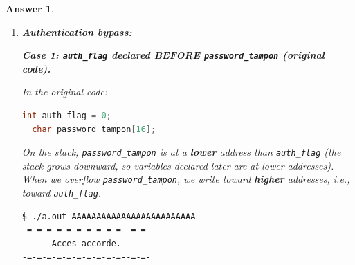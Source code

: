 \documentclass[a4paper,11pt]{article}
\theoremstyle{plain}
\newtheorem{correction}{Answer}
\theoremstyle{definition}
\begin{document}
\begin{correction}
\begin{enumerate}
The variable \texttt{valeur} now contains \texttt{0x43434343} (the ASCII code for 'C' is \texttt{0x43}). The overflow has \textbf{overwritten the integer variable} with our chosen bytes.

\medskip
\textbf{GDB analysis:}
\begin{lstlisting}[language=bash,numbers=none]
$ gdb ./a.out
(gdb) break main
(gdb) run AAAAAAAABBBBBBBBCCCC
(gdb) info locals
valeur = 5
(gdb) x/40bx tampon_deux
\end{lstlisting}

In GDB, \texttt{x/40bx} displays 40 bytes starting from \texttt{tampon\_deux}. You can observe the adjacent memory layout: \texttt{tampon\_deux} (8 bytes) $\rightarrow$ \texttt{tampon\_un} (8 bytes) $\rightarrow$ padding $\rightarrow$ \texttt{valeur} (4 bytes).

\medskip
\textbf{Explanation:} The variables are stored adjacently on the stack in decreasing address order. Since \texttt{strcpy} does not check bounds, writing beyond \texttt{tampon\_deux}'s 8 bytes continues into the memory occupied by \texttt{tampon\_un} and then \texttt{valeur}.

\begin{attention}
The exact memory layout depends on the compiler and optimization level. Always use \texttt{gdb} to verify the actual addresses and offsets on your system. The compiler may add padding between variables for alignment purposes.
\end{attention}

\item \textbf{Authentication bypass:}

\medskip
\textbf{Case 1: \texttt{auth\_flag} declared BEFORE \texttt{password\_tampon} (original code).}

In the original code:
\begin{lstlisting}[language=C,numbers=none]
  int auth_flag = 0;
  char password_tampon[16];
\end{lstlisting}

On the stack, \texttt{password\_tampon} is at a \textbf{lower} address than \texttt{auth\_flag} (the stack grows downward, so variables declared later are at lower addresses). When we overflow \texttt{password\_tampon}, we write toward \textbf{higher} addresses, i.e., toward \texttt{auth\_flag}.

\begin{lstlisting}[language=bash,numbers=none]
$ ./a.out AAAAAAAAAAAAAAAAAAAAAAAAA
-=-=-=-=-=-=-=-=-=-=--=-=-
      Acces accorde.
-=-=-=-=-=-=-=-=-=-=--=-=-
\end{lstlisting}


\end{enumerate}
\end{correction}
\end{document}
